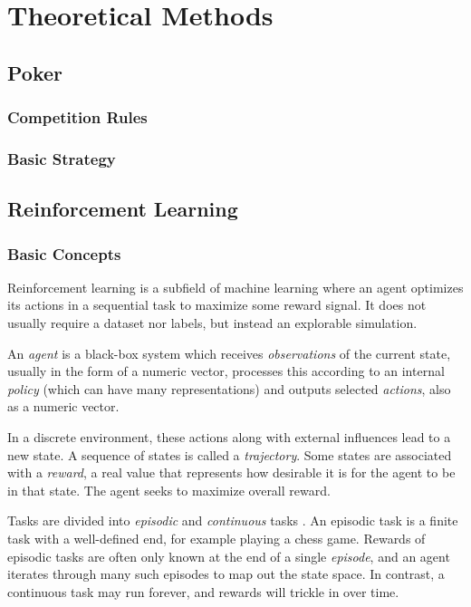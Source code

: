 \chapter{Theoretical Methods}


\section{Poker}

\subsection{Competition Rules}

\subsection{Basic Strategy}

\section{Reinforcement Learning}
\label{ReinforcementLearningChapter}
\subsection{Basic Concepts}
Reinforcement learning is a subfield of machine learning where an agent optimizes its actions in a sequential task to maximize some reward signal. It does not usually require a dataset nor labels, but instead an explorable simulation.

An \textit{agent} is a black-box system which receives \textit{observations} of the current state, usually in the form of a numeric vector, processes this according to an internal \textit{policy} (which can have many representations) and outputs selected \textit{actions}, also as a numeric vector.

In a discrete environment, these actions along with external influences lead to a new state. A sequence of states is called a \textit{trajectory}. Some states are associated with a \textit{reward}, a real value that represents how desirable it is for the agent to be in that state. The agent seeks to maximize overall reward.

Tasks are divided into \textit{episodic} and \textit{continuous} tasks \cite[Chapters 3.3 \& 3.4]{Sutton}. An episodic task is a finite task with a well-defined end, for example playing a chess game. Rewards of episodic tasks are often only known at the end of a single \textit{episode}, and an agent iterates through many such episodes to map out the state space. In contrast, a continuous task may run forever, and rewards will trickle in over time. 

